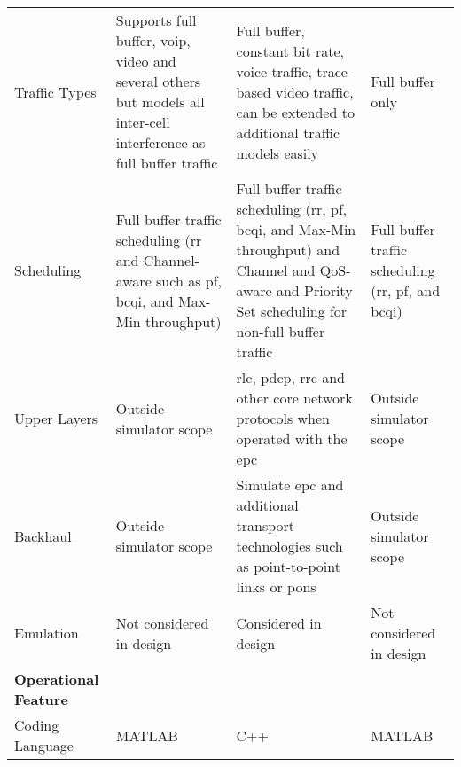 \documentclass[conference]{IEEEtran}
\begin{document}
\begin{table*}[tph]
{\begin{tabular}{>{\raggedright\arraybackslash}m{}>{\raggedright\arraybackslash}m{}>{\raggedright\arraybackslash}m{}>{\raggedright\arraybackslash}m{}}
     \vspace{2mm}   Traffic Types							&  \vspace{2mm} Supports full buffer, \ac{voip}, video and several others but models all inter-cell interference as full buffer traffic				& \vspace{2mm} Full buffer, constant bit rate, voice traffic, trace-based video traffic, can be extended to additional traffic models easily  & \vspace{2mm} Full buffer only\\
\vspace{2mm}        Scheduling								&		\vspace{2mm}Full buffer traffic scheduling (\ac{rr} and Channel-aware such as \ac{pf}, \ac{bcqi}, and Max-Min throughput) 			& \vspace{2mm}Full buffer traffic scheduling (\ac{rr}, \ac{pf}, \ac{bcqi}, and Max-Min throughput)	and Channel and QoS-aware and Priority Set scheduling	for non-full buffer traffic		& \vspace{2mm}Full buffer traffic scheduling (\ac{rr}, \ac{pf}, and \ac{bcqi})  \\
      \vspace{2mm}  Upper Layers	 		& \vspace{2mm}Outside simulator scope					& 	\vspace{2mm}\ac{rlc}, \ac{pdcp}, \ac{rrc} and other core network protocols when operated with the \ac{epc}		& \vspace{2mm}Outside simulator scope \\
     \vspace{2mm}   Backhaul								& 			\vspace{2mm} Outside simulator scope			&		\vspace{2mm} Simulate \ac{epc} and
additional transport technologies such as point-to-point links or \acp{pon} \cite{Pedro2013}			&  \vspace{2mm} Outside simulator scope \\
        \vspace{2mm} Emulation								& 	\vspace{2mm}Not considered in design		& 	 \vspace{2mm}Considered in design	& \vspace{2mm}Not considered in design \\
\midrule
        \textbf{Operational Feature}			&   					&   				&  \\
        \midrule
        \vspace{1mm}Coding Language 						&   MATLAB              &   C++       & MATLAB \\

\end{tabular}}
\end{table*}
\end{document}
